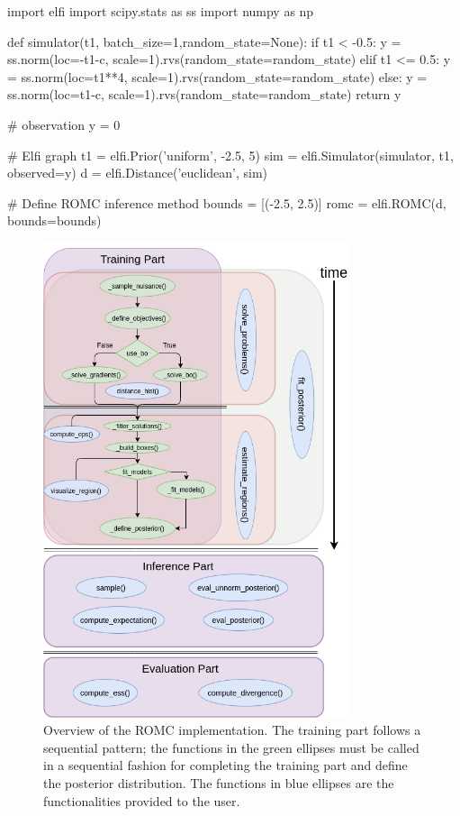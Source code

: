 \begin{pythoncode}
  import elfi import scipy.stats as ss
  import numpy as np
  
  def simulator(t1, batch_size=1,random_state=None):
      if t1 < -0.5:
          y = ss.norm(loc=-t1-c, scale=1).rvs(random_state=random_state)
      elif t1 <= 0.5:
          y = ss.norm(loc=t1**4, scale=1).rvs(random_state=random_state)
      else:
          y = ss.norm(loc=t1-c, scale=1).rvs(random_state=random_state)
      return y

  # observation
  y = 0
      
  # Elfi graph
  t1 = elfi.Prior('uniform', -2.5, 5)
  sim = elfi.Simulator(simulator, t1, observed=y)
  d = elfi.Distance('euclidean', sim)

  # Define ROMC inference method
  bounds = [(-2.5, 2.5)]
  romc = elfi.ROMC(d, bounds=bounds)
\end{pythoncode}


\begin{figure}[!ht]
    \begin{center}
\includegraphics[width=0.8\textwidth]{./Thesis/graphs/ROMC.png}
    \end{center}
    \caption[Overview of the ROMC implementation.]{Overview of the
ROMC implementation. The training part follows a sequential pattern;
the functions in the green ellipses must be called in a sequential
fashion for completing the training part and define the posterior
distribution. The functions in blue ellipses are the functionalities
provided to the user.}
    \label{fig:romc_overview}
\end{figure}

  